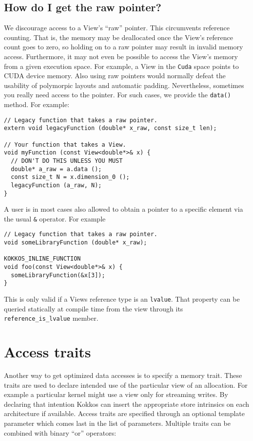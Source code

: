 \subsection{How do I get the raw pointer?}

We discourage access to a View's ``raw'' pointer.  This circumvents
reference counting.  That is, the memory may be deallocated once the
View's reference count goes to zero, so holding on to a raw pointer
may result in invalid memory access.  Furthermore, it may not even be
possible to access the View's memory from a given execution space.
For example, a View in the \lstinline!Cuda! space points to CUDA device
memory. Also using raw pointers would normally defeat the usability 
of polymorpic layouts and automatic padding. 
Nevertheless, sometimes you really need access to the
pointer.  For such cases, we provide the \lstinline!data()!
method.  For example:
\begin{lstlisting}
// Legacy function that takes a raw pointer.
extern void legacyFunction (double* x_raw, const size_t len);

// Your function that takes a View.
void myFunction (const View<double*>& x) {
  // DON'T DO THIS UNLESS YOU MUST
  double* a_raw = a.data ();
  const size_t N = x.dimension_0 ();
  legacyFunction (a_raw, N);
}
\end{lstlisting}
A user is in most cases also allowed to obtain a pointer to a specific 
element via the usual \lstinline|&| operator. For example

\begin{lstlisting}
// Legacy function that takes a raw pointer.
void someLibraryFunction (double* x_raw);

KOKKOS_INLINE_FUNCTION
void foo(const View<double*>& x) {
  someLibraryFunction(&x[3]);
}
\end{lstlisting}

This is only valid if a Views reference type is an \lstinline|lvalue|.
That property can be queried statically at compile time from the view through
its \lstinline|reference_is_lvalue| member. 



\section{Access traits}\label{S:View:AccessTraits}


Another way to get optimized data accesses is to specify a memory trait. 
These traits are used to declare intended use of the particular view of 
an allocation. For example a particular kernel might use a view only for 
streaming writes. By declaring that intention Kokkos can insert the 
appropriate store intrinsics on each architecture if available. Access traits
are specified through an optional template parameter which comes last in the list
of parameters. Multiple traits can be combined with binary ``or'' operators: 

